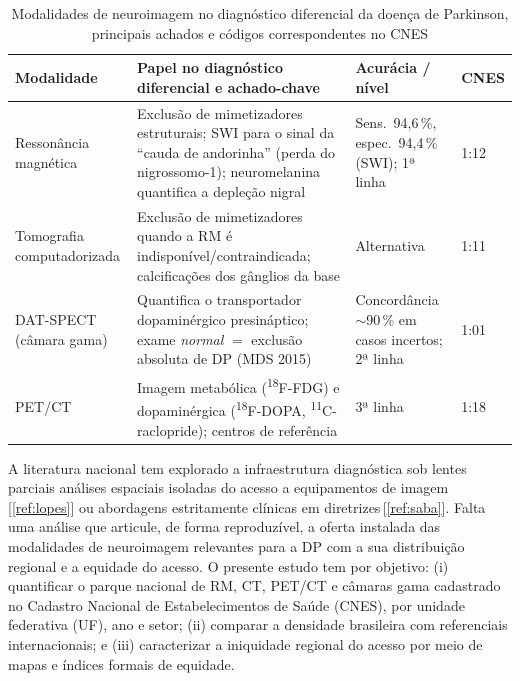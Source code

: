 \documentclass[12pt,a4paper,oneside]{article}
\begin{document}
\begin{table}[htbp]
\centering
\caption{Modalidades de neuroimagem no diagnóstico diferencial da
doença de Parkinson, principais achados e códigos correspondentes no
CNES}
\small
\begin{tabular}{@{}p{2.0cm}p{6.2cm}p{2.5cm}p{1.0cm}@{}}
\toprule
\textbf{Modalidade} & \textbf{Papel no diagnóstico diferencial e
achado-chave} & \textbf{Acurácia / nível} & \textbf{CNES} \\
\midrule
Ressonância magnética & Exclusão de mimetizadores estruturais; SWI
para o sinal da ``cauda de andorinha'' (perda do nigrossomo-1);
neuromelanina quantifica a depleção nigral & Sens.\ 94,6\,\%, espec.\
94,4\,\% (SWI); 1ª linha & 1:12 \\
Tomografia computadorizada & Exclusão de mimetizadores quando a RM é
indisponível/contraindicada; calcificações dos gânglios da base &
Alternativa & 1:11 \\
DAT-SPECT (câmara gama) & Quantifica o transportador dopaminérgico
presináptico; exame \textit{normal} $=$ exclusão absoluta de DP
(MDS 2015) & Concordância $\sim$90\,\% em casos incertos; 2ª linha &
1:01 \\
PET/CT & Imagem metabólica (\textsuperscript{18}F-FDG) e dopaminérgica
(\textsuperscript{18}F-DOPA, \textsuperscript{11}C-raclopride);
centros de referência & 3ª linha & 1:18 \\
\bottomrule
\end{tabular}
\par{}
\label{tab:stack}
\end{table}

A literatura nacional tem explorado a infraestrutura diagnóstica sob
lentes parciais \textemdash{} análises espaciais isoladas do acesso a
equipamentos de imagem\,[\ref{ref:lopes}] ou abordagens estritamente
clínicas em diretrizes\,[\ref{ref:saba}]. Falta uma análise que
articule, de forma reproduzível, a oferta instalada das modalidades
de neuroimagem relevantes para a DP com a sua distribuição regional e
a equidade do acesso. O presente estudo tem por objetivo: (i)
quantificar o parque nacional de RM, CT, PET/CT e câmaras gama
cadastrado no Cadastro Nacional de Estabelecimentos de Saúde (CNES),
por unidade federativa (UF), ano e setor; (ii) comparar a densidade
brasileira com referenciais internacionais; e (iii) caracterizar a
iniquidade regional do acesso por meio de mapas e índices formais de
equidade.
\end{document}
